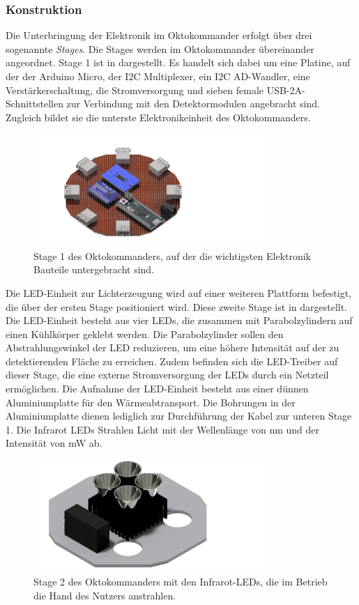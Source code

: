 \subsubsection*{Konstruktion}
Die Unterbringung der Elektronik im Oktokommander erfolgt über drei sogenannte \textit{Stages}. Die Stages werden im Oktokommander übereinander angeordnet. Stage 1 ist in  dargestellt. Es handelt sich dabei um eine Platine, auf der der Arduino Micro, der I2C Multiplexer, ein I2C AD-Wandler, eine Verstärkerschaltung, die Stromversorgung und sieben female USB-2A-Schnittstellen zur Verbindung mit den Detektormodulen angebracht sind. Zugleich bildet sie die unterste Elektronikeinheit des Oktokommanders.
\begin{figure}[H]
	\centering
	\includegraphics[width=9cm]{../CAD_Bilder/OktagonElektronik_Stage1_raytraced.png}
	\caption{Stage 1 des Oktokommanders, auf der die wichtigsten Elektronik Bauteile untergebracht sind.}
	\label{fig:OktoStage1}
\end{figure}
\noindent
Die LED-Einheit zur Lichterzeugung wird auf einer weiteren Plattform befestigt, die über der ersten Stage positioniert wird. Diese zweite Stage ist in  dargestellt. Die LED-Einheit besteht aus vier LEDs, die zusammen mit Parabolzylindern auf einen Kühlkörper geklebt werden. Die Parabolzylinder sollen den Abstrahlungswinkel der LED reduzieren, um eine höhere Intensität auf der zu detektierenden Fläche zu erreichen. Zudem befinden sich die LED-Treiber auf dieser Stage, die eine externe Stromversorgung der LEDs durch ein Netzteil ermöglichen. Die Aufnahme der LED-Einheit besteht aus einer dünnen Aluminiumplatte für den Wärmeabtransport. Die Bohrungen in der Aluminiumplatte dienen lediglich zur Durchführung der Kabel zur unteren Stage 1. Die Infrarot LEDs Strahlen Licht mit der Wellenlänge von \unit[945]{nm} und der Intensität von \unit[300]{mW} ab. 
\begin{figure}[H]
	\centering
	\includegraphics[width=9cm]{../CAD_Bilder/OktagonElektronik_Stage2_raytraced.png}
	\caption{Stage 2 des Oktokommanders mit den Infrarot-LEDs, die im Betrieb die Hand des Nutzers anstrahlen.}
	\label{fig:OktoStage2}
\end{figure}

